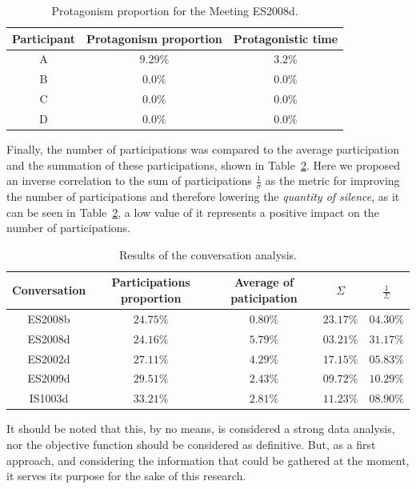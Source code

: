 \begin{table}[H]
    \centering
    \begin{tabular}{ccc}
    \hline
    Participant & Protagonism proportion & Protagonistic time\\ \hline 
    A           & $9.29\%$               & $3.2\%$            \\
    B           & $0.0\%$                & $0.0\%$            \\
    C           & $0.0\%$                & $0.0\%$            \\
    D           & $0.0\%$                & $0.0\%$            \\
    \hline
    \end{tabular}
    \caption{Protagonism proportion for the Meeting ES2008d.}
    \label{table:res_ES2008d}
\end{table}

Finally, the number of participations was compared to the average participation and the summation of these participations, shown in Table~\ref{table:results_ami}. Here we proposed an inverse correlation to the sum of participations $\frac{1}{\sigma}$ as the metric for improving the number of participations and therefore lowering the \textit{quantity of silence}, as it can be seen in Table~\ref{table:results_ami}, a low value of it represents a positive impact on the number of participations.

\begin{table}[H]
    \centering
    \begin{tabular}{ccccc}
    \hline
    Conversation & Participations proportion & Average  of paticipation & $\Sigma$ & $\frac{1}{\Sigma}$ \\ \hline
    ES2008b & $24.75\%$ & $0.80\%$ & $23.17\%$  & $04.30\%$ \\
    ES2008d & $24.16\%$ & $5.79\%$ & $03.21\%$  & $31.17\%$ \\
    ES2002d & $27.11\%$ & $4.29\%$ & $17.15\%$  & $05.83\%$ \\
    ES2009d & $29.51\%$ & $2.43\%$ & $09.72\%$  & $10.29\%$ \\
    IS1003d & $33.21\%$ & $2.81\%$ & $11.23\%$  & $08.90\%$ \\
    \hline
    \end{tabular}
    \caption{Results of the conversation analysis.}
    \label{table:results_ami}
\end{table}

It should be noted that this, by no means, is considered a strong data analysis, nor the objective function should be considered as definitive. But, as a first approach, and considering the information that could be gathered at the moment, it serves its purpose for the sake of this research.

